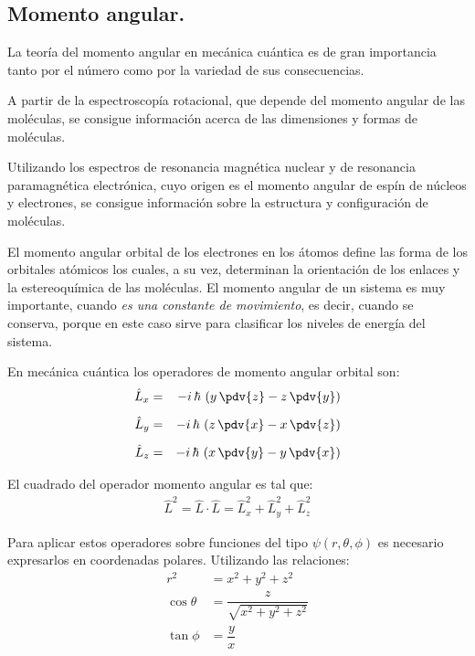 \subsection{Momento angular.}

La teoría del momento angular en mecánica cuántica es de gran importancia tanto por el número como por la variedad de sus consecuencias.
\par
A partir de la espectroscopía rotacional, que depende del momento angular de las moléculas, se consigue información acerca de las dimensiones y formas de moléculas.
\par
Utilizando los espectros de resonancia magnética nuclear y de resonancia paramagnética electrónica, cuyo origen es el momento angular de espín de núcleos y electrones, se consigue información sobre la estructura y configuración de moléculas.
\par
El momento angular orbital de los electrones en los átomos define las forma de los orbitales atómicos los cuales, a su vez, determinan la orientación de los enlaces y la estereoquímica de las moléculas. El momento angular de un sistema es muy importante, cuando \emph{es una constante de movimiento}, es decir, cuando se conserva, porque en este caso sirve para clasificar los niveles de energía del sistema.
\par
En mecánica cuántica los operadores de momento angular orbital son:
\begin{align}
\begin{aligned}
\hat{L}_{x} &=& - i \, \hbar \, \left( y \, \pdv{z} - z \, \pdv{y} \right) \\[0.5em] 
\hat{L}_{y} &=& - i \, \hbar \, \left( z \, \pdv{x} - x \, \pdv{z} \right) \\[0.5em] 
\hat{L}_{z} &=& - i \, \hbar \, \left( x \, \pdv{y} - y \, \pdv{x} \right)
\end{aligned}
\label{eq:ecuacion_01_03a}
\end{align}

El cuadrado del operador momento angular es tal que:
\begin{align}
\hat{L}^{2} = \hat{L} \cdot \hat{L} = \hat{L}_{x}^{2} + \hat{L}_{y}^{2} + \hat{L}_{z}^{2}
\label{eq:ecuacion_01_03b}
\end{align}

Para aplicar estos operadores sobre funciones del tipo $\psi(r, \theta, \phi)$ es necesario expresarlos en coordenadas polares. Utilizando las relaciones:
\begin{align*}
r^{2} &= x^{2} + y^{2} +z^{2} \\
\cos \theta &= \dfrac{z}{\sqrt{x^{2} + y^{2} +z^{2}}} \\
\tan \phi &= \dfrac{y}{x}
\end{align*}
 
